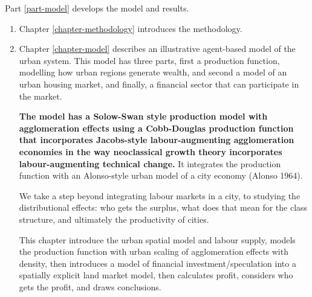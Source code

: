 Part \ref{part-model} develops the model and results.
\begin{enumerate}
    \item Chapter \ref{chapter-methodology} introduces the methodology. %
    \item Chapter \ref{chapter-model} describes an illustrative agent-based model of the urban system. 
    This model has three  parts, first a production function, modelling how urban regions generate wealth, and second a model of an urban housing market, and finally, a financial sector that can participate in the market. 

\textbf{The model has a Solow-Swan style production model with agglomeration effects using a \gls{Cobb-Douglas} production function that incorporates Jacobs-style labour-augmenting agglomeration economies %
in the way neoclassical growth theory incorporates labour-augmenting technical change.}
It integrates the production function with an Alonso-style urban model of a city economy (Alonso 1964). 

We take a step beyond integrating labour markets in a city, to studying the distributional effects: who gets the surplus, what does that mean for the class structure, and ultimately the productivity of cities. 

This chapter introduce the urban spatial model and labour supply, models the production function with urban scaling of agglomeration effects with density, then introduces a model of financial investment/speculation into a spatially explicit land market model, then calculates profit, considers who gets the profit, and draws conclusions. 
 

\end{enumerate}
